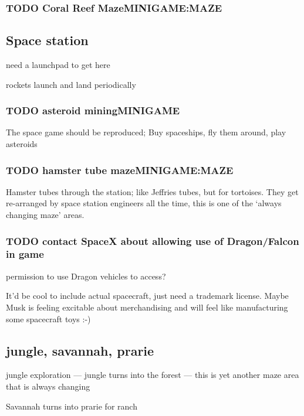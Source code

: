 \documentclass[11pt]{article}
\begin{document}
\begin{enumerate}
\subsubsection{{\bfseries\sffamily TODO} Coral Reef Maze\hfill{}\textsc{MINIGAME:MAZE}}
\label{sec-4-3-2}
\subsection{Space station}
\label{sec-4-4}

need a launchpad to get here

rockets launch and land periodically

\subsubsection{{\bfseries\sffamily TODO} asteroid mining\hfill{}\textsc{MINIGAME}}
\label{sec-4-4-1}

The space game should be  reproduced; Buy spaceships, fly them around,
play asteroids
\subsubsection{{\bfseries\sffamily TODO} hamster tube maze\hfill{}\textsc{MINIGAME:MAZE}}
\label{sec-4-4-2}

Hamster tubes through the station; like Jeffries tubes, but for
tortoises. They get re-arranged by space station engineers all the
time, this is one of the ‘always changing maze’ areas.
\subsubsection{{\bfseries\sffamily TODO} contact SpaceX about allowing use of Dragon/Falcon in game}
\label{sec-4-4-3}

permission to use Dragon vehicles to access?

It'd be cool to include actual spacecraft, just need a trademark
license.  Maybe Musk is feeling excitable about merchandising and will
feel like manufacturing some spacecraft toys :-)
\subsection{jungle, savannah, prarie}
\label{sec-4-5}

jungle exploration — jungle turns into the forest — this is
yet another maze area that is always changing

Savannah turns into prarie for ranch


\end{enumerate}
\end{document}
